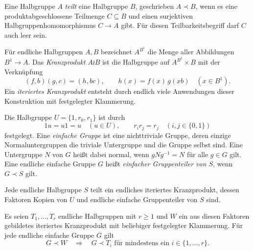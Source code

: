 \begin{definition}
\label{def:b37-guide-division}
Eine Halbgruppe $A$ \emph{teilt} eine Halbgruppe $B$, geschrieben
$A\prec B$, wenn es eine produktabgeschlossene Teilmenge $C\subseteq B$ und einen
surjektiven Halbgruppenhomomorphismus $C\to A$ gibt.
Für diesen Teilbarkeitsbegriff darf $C$ auch leer sein.
\end{definition}

\begin{definition}[Kranzprodukt]
\label{def:b37-guide-wreath}
Für endliche Halbgruppen $A,B$ bezeichnet $A^{B^1}$ die Menge aller
Abbildungen $B^1\to A$. Das \emph{Kranzprodukt} $A\wr B$ ist die
Halbgruppe auf $A^{B^1}\times B$ mit der Verknüpfung
\[
 (f,b)(g,c)=(h,bc),
 \qquad h(x)=f(x)\,g(xb)\quad(x\in B^1).
\]
Ein \emph{iteriertes Kranzprodukt} entsteht durch endlich viele
Anwendungen dieser Konstruktion mit festgelegter Klammerung.
\end{definition}

\begin{definition}
\label{def:b37-guide-prime-blocks}
Die Halbgruppe $U=\{1,r_0,r_1\}$ ist durch
\[
 1u=u1=u\quad(u\in U),\qquad
 r_i r_j=r_j\quad(i,j\in\{0,1\})
\]
festgelegt. Eine \emph{einfache Gruppe} ist eine nichttriviale Gruppe,
deren einzige Normaluntergruppen die triviale Untergruppe und die
Gruppe selbst sind. Eine Untergruppe $N$ von $G$ heißt dabei normal,
wenn $gNg^{-1}=N$ für alle $g\in G$ gilt.
Eine endliche einfache Gruppe $G$ heißt
\emph{einfacher Gruppenteiler von $S$}, wenn $G\prec S$ gilt.
\end{definition}

\begin{theorem}
\label{thm:b37-guide-krohn-rhodes}
Jede endliche Halbgruppe $S$ teilt ein endliches iteriertes Kranzprodukt,
dessen Faktoren Kopien von $U$ und endliche einfache Gruppenteiler
von $S$ sind. \cite{KrohnRhodes1965,RhodesSteinberg2009}
\end{theorem}

\begin{theorem}
\label{thm:b37-guide-prime-group-divisors}
Es seien $T_1,\ldots,T_r$ endliche Halbgruppen mit $r\geq1$ und
$W$ ein aus diesen Faktoren gebildetes iteriertes Kranzprodukt
mit beliebiger festgelegter Klammerung.
Für jede endliche einfache Gruppe $G$ gilt
\[
 G\prec W\quad\Longrightarrow\quad
 G\prec T_i\text{ für mindestens ein }i\in\{1,\ldots,r\}.
\]
\cite[Satz~4.1.45]{RhodesSteinberg2009}
\end{theorem}

